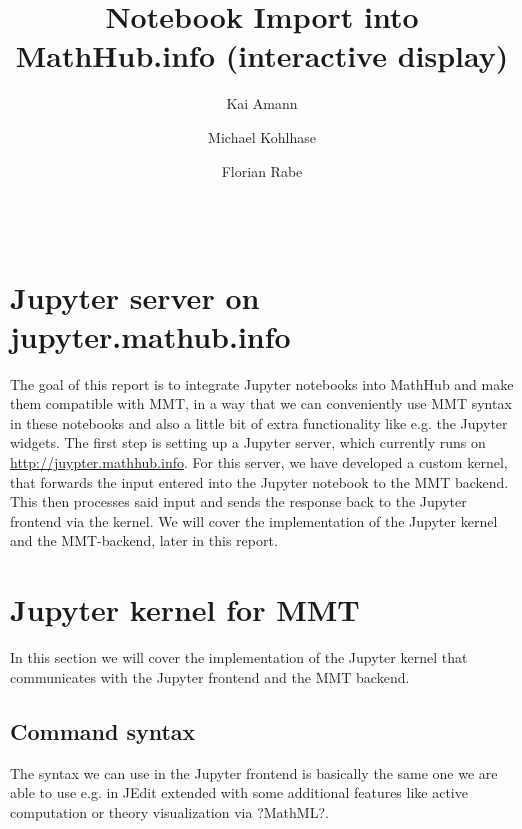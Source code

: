 \documentclass[book]{deliverablereport}
\title{Notebook Import into MathHub.info (interactive display)}
\author{Kai Amann}
\author{Michael Kohlhase}
\author{Florian Rabe}
\begin{document}
\begin{abstract}\strut\\
\end{abstract}
\maketitle
\newpage\tableofcontents\newpage

\section{Jupyter server on jupyter.mathub.info}
The goal of this report is to integrate Jupyter notebooks into MathHub
and make them compatible with MMT, in a way that we can conveniently use 
MMT syntax in these notebooks and also a little bit of extra functionality
like e.g. the Jupyter widgets. The first step is setting up a Jupyter server,
which currently runs on \url{http://juypter.mathhub.info}. 
For this server, we have developed a custom kernel, that forwards the input 
entered into the Jupyter notebook to the MMT backend. This then processes 
said input and sends the response back to the Jupyter frontend via the kernel.
We will cover the implementation of the Jupyter kernel and the MMT-backend,
later in this report.

\section{Jupyter kernel for MMT}
In this section we will cover the implementation of the Jupyter kernel that
communicates with the Jupyter frontend and the MMT backend. 

\subsection{Command syntax}
The syntax we can use in the Jupyter frontend is basically the same one we are able to 
use e.g. in JEdit extended with some additional features like active computation
or theory visualization via ?MathML?. 
\end{document}
